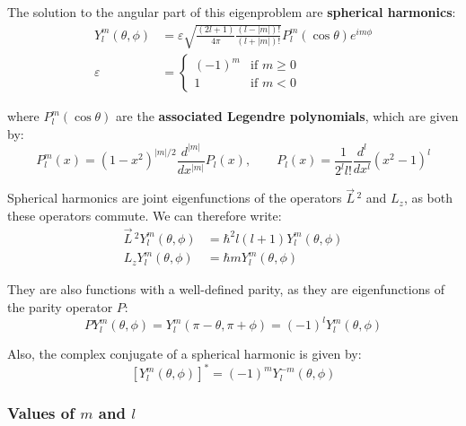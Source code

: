 The solution to the angular part of this eigenproblem are \textbf{spherical harmonics}:
\begin{equation}
    \begin{split}
        Y_l^m(\theta, \phi) &= \varepsilon\sqrt{\frac{(2l+1)}{4\pi}\frac{(l-|m|)!}{(l+|m|)!}}P_l^m(\cos\theta)e^{im\phi} \\
        \varepsilon &= \begin{cases}
            (-1)^m & \text{if } m \geq 0 \\
            1 & \text{if } m < 0
        \end{cases}
    \end{split}
\end{equation}

where $P_l^m(\cos\theta)$ are the \textbf{associated Legendre polynomials}, which are given by:
\begin{equation}
    P_l^m(x) = (1-x^2)^{|m|/2}\frac{d^{|m|}}{dx^{|m|}}P_l(x), \qquad P_l(x) = \frac{1}{2^ll!}\frac{d^l}{dx^l}(x^2-1)^l
\end{equation}

Spherical harmonics are joint eigenfunctions of the operators $\vec{L}\,^2$ and $L_z$, as both these operators commute. We can therefore write:
\begin{equation} \label{spherical_eig_eqn}
    \begin{split}
        \vec{L}\,^2Y_l^m(\theta, \phi) &= \hbar^2l(l+1)Y_l^m(\theta, \phi) \\
        L_zY_l^m(\theta, \phi) &= \hbar mY_l^m(\theta, \phi)
    \end{split}
\end{equation}


They are also functions with a well-defined parity, as they are eigenfunctions of the parity operator $P$:
\begin{equation} \label{parity_spherical_harmonics}
    PY_l^m(\theta, \phi) = Y_l^m(\pi-\theta, \pi+\phi) = (-1)^lY_l^m(\theta, \phi)
\end{equation}

Also, the complex conjugate of a spherical harmonic is given by:
\begin{equation}
    \left[Y_l^{m}(\theta, \phi)\right]^* = (-1)^mY_l^{-m}(\theta, \phi)
\end{equation}

\subsubsection{Values of $m$ and $l$}

